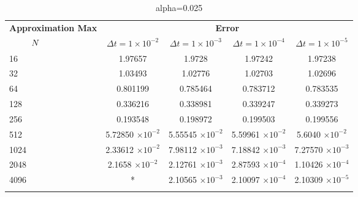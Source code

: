 \begin{table}
	\begin{tabular}{lcccc}
		\toprule
		\multicolumn{1}{c}{\textbf{Approximation Max}} & \multicolumn{4}{c}{\textbf{Error}} \\
		$\hspace{9mm}N$ & $\Delta t=1\times 10^{-2}$ & $\Delta t=1\times 10^{-3}$ & $\Delta t=1\times 10^{-4}$ & $\Delta t=1\times 10^{-5}$ \\
		\midrule
		\hspace{7mm} 16 & 1.97657   & 1.9728     & 1.97242     & 1.97238     \\
		\midrule
		\hspace{7mm} 32 & 1.03493   & 1.02776    & 1.02703     & 1.02696     \\
		\midrule
		\hspace{7mm} 64 & 0.801199  & 0.785464   & 0.783712    & 0.783535    \\
		\midrule
		\hspace{7mm} 128 & 0.336216  & 0.338981   & 0.339247    & 0.339273    \\
		\midrule
		\hspace{7mm} 256 & 0.193548  & 0.198972   & 0.199503    & 0.199556    \\
		\midrule
		\hspace{7mm} 512 & 5.72850 $\times 10 ^{-2}$  & 5.55545 $\times 10 ^{-2}$  & 5.59961 $\times 10 ^{-2}$   & 5.6040 $\times 10 ^{-2}$     \\
		\midrule
		\hspace{7mm} 1024 & 2.33612 $\times 10 ^{-2}$ & 7.98112 $\times 10 ^{-3}$ & 7.18842 $\times 10 ^{-3}$  & 7.27570 $\times 10 ^{-3}$   \\
		\midrule
		\hspace{7mm} 2048 & 2.1658 $\times 10 ^{-2}$  & 2.12761 $\times 10 ^{-3}$ & 2.87593 $\times 10 ^{-4}$ & 1.10426 $\times 10 ^{-4}$ \\
		\midrule
		\hspace{7mm} 4096 & * & 2.10565 $\times 10 ^{-3}$ & 2.10097 $\times 10 ^{-4}$ & 2.10309 $\times 10 ^{-5}$ \\
		\\
		\bottomrule
	\end{tabular}
	\caption{alpha=0.025}
\end{table}

